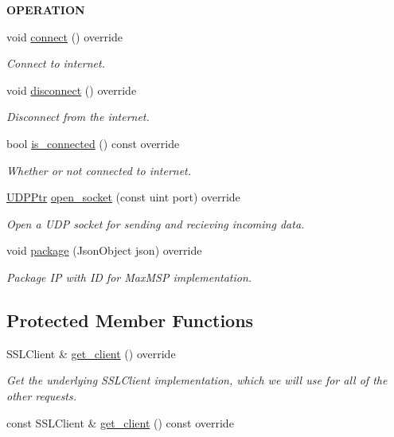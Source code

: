 \begin{Indent}{\bf O\+P\+E\+R\+A\+T\+I\+ON}\par
\begin{DoxyCompactItemize}
\item 
void \hyperlink{class_loom___wi_fi_a741402e5003f248d2c3ed4e7b222a926}{connect} () override
\begin{DoxyCompactList}\small\item\em Connect to internet. \end{DoxyCompactList}\item 
void \hyperlink{class_loom___wi_fi_a04ff3733be0b54c8bc48aa5cb652a31f}{disconnect} () override
\begin{DoxyCompactList}\small\item\em Disconnect from the internet. \end{DoxyCompactList}\item 
bool \hyperlink{class_loom___wi_fi_a948eb2892e06294750c121d986abf179}{is\+\_\+connected} () const override
\begin{DoxyCompactList}\small\item\em Whether or not connected to internet. \end{DoxyCompactList}\item 
\hyperlink{class_loom_internet_plat_a0b2cc742a6ac5f4f7054b75ea99b345c}{U\+D\+P\+Ptr} \hyperlink{class_loom___wi_fi_aca028d9a3a39206d85b1eaac63cf0048}{open\+\_\+socket} (const uint port) override
\begin{DoxyCompactList}\small\item\em Open a U\+DP socket for sending and recieving incoming data. \end{DoxyCompactList}\item 
void \hyperlink{class_loom___wi_fi_a536247ffb9228c55d5a2473d8df9a58b}{package} (Json\+Object json) override
\begin{DoxyCompactList}\small\item\em Package IP with ID for Max\+M\+SP implementation. \end{DoxyCompactList}\end{DoxyCompactItemize}
\end{Indent}
\subsection*{Protected Member Functions}
\begin{DoxyCompactItemize}
\item 
S\+S\+L\+Client \& \hyperlink{class_loom___wi_fi_afa854fccc5b59f6cfce8751d3223133c}{get\+\_\+client} () override
\begin{DoxyCompactList}\small\item\em Get the underlying S\+S\+L\+Client implementation, which we will use for all of the other requests. \end{DoxyCompactList}\item 
const S\+S\+L\+Client \& \hyperlink{class_loom___wi_fi_a115964eb261df0585ab71e796d02f9d4}{get\+\_\+client} () const override
\end{DoxyCompactItemize}
